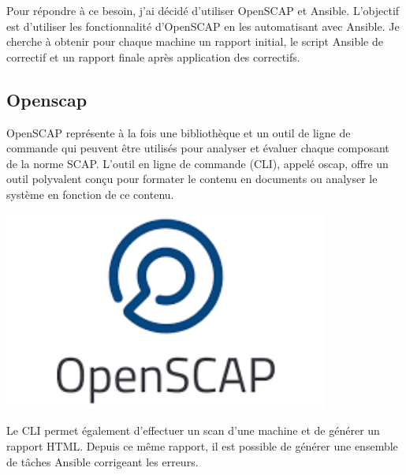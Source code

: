 \documentclass[12pt]{article}
\begin{document}
Pour répondre à ce besoin, j'ai décidé d'utiliser \gls{OpenSCAP} et \gls{Ansible}. 
L'objectif est d'utiliser les fonctionnalité d'\gls{OpenSCAP} en les automatisant avec \gls{Ansible}.
Je cherche à obtenir pour chaque machine un rapport initial, le script \gls{Ansible} de correctif et un rapport finale après application des correctifs. 

\subsection{Openscap}
\noindent%
\begin{minipage}{.7\textwidth}%
\gls{OpenSCAP} représente à la fois une bibliothèque et un outil de ligne de commande qui peuvent être utilisés pour analyser et évaluer chaque composant de la norme \gls{SCAP}. 
L'outil en ligne de commande (\gls{CLI}), appelé oscap, offre un outil polyvalent conçu pour formater le contenu en documents ou analyser le système en fonction de ce contenu. \cite{OpenSCAP} \\
\end{minipage}%
\hfill
\begin{minipage}{.3\textwidth}%
\begin{center}
\includegraphics[width=0.8\textwidth]{src/logo_openscap.png}
\end{center}
\end{minipage}%

Le \gls{CLI} permet également d'effectuer un scan d'une machine et de générer un rapport HTML.
Depuis ce même rapport, il est possible de générer une ensemble de tâches \gls{Ansible} corrigeant les erreurs.
\end{document}
